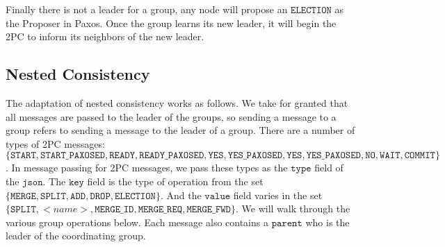 \documentclass{amsart}
\theoremstyle{definition}
\theoremstyle{remark}
\numberwithin{equation}{section}
\begin{document}
Finally there is not a leader for a group, any node will propose an $\mathtt{ELECTION}$ as the Proposer in Paxos. Once the group learns its new leader, it will begin the 2PC to inform its neighbors of the new leader.
\subsection{Nested Consistency}
The adaptation of nested consistency works as follows. We take for granted that all messages are passed to the leader of the groups, so sending a message to a group refers to sending a message to the leader of a group. There are a number of types of 2PC messages: \\
$\{ \mathtt{START}, \mathtt{START\_PAXOSED}, \mathtt{READY}, \mathtt{READY\_PAXOSED}, \mathtt{YES}, \mathtt{YES\_PAXOSED}, \mathtt{YES}, \mathtt{YES\_PAXOSED}, \mathtt{NO}, \mathtt{WAIT}, \mathtt{COMMIT} \}$. In message passing for 2PC messages, we pass these types as the $\mathtt{type}$ field of the $\mathtt{json}$. The $\mathtt{key}$ field is the type of operation from the set $\{ \mathtt{MERGE}, \mathtt{SPLIT}, \mathtt{ADD}, \mathtt{DROP}, \mathtt{ELECTION} \}$. And the $\mathtt{value}$ field varies in the set $\{ \mathtt{SPLIT}, <name>, \mathtt{MERGE\_ID}, \mathtt{MERGE\_REQ}, \mathtt{MERGE\_FWD} \}$. We will walk through the various group operations below. Each message also contains a $\mathtt{parent}$ who is the leader of the coordinating group. 
\end{document}
